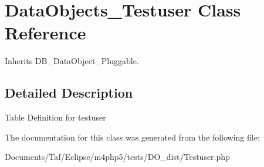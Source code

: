 \hypertarget{classDataObjects__Testuser}{
\section{DataObjects\_\-Testuser Class Reference}
\label{classDataObjects__Testuser}
}
Inherits DB\_\-DataObject\_\-Pluggable.



\subsection{Detailed Description}
Table Definition for testuser 

The documentation for this class was generated from the following file:\begin{CompactItemize}
\item 
Documents/Taf/Eclipse/m4php5/tests/DO\_\-dist/Testuser.php\end{CompactItemize}
